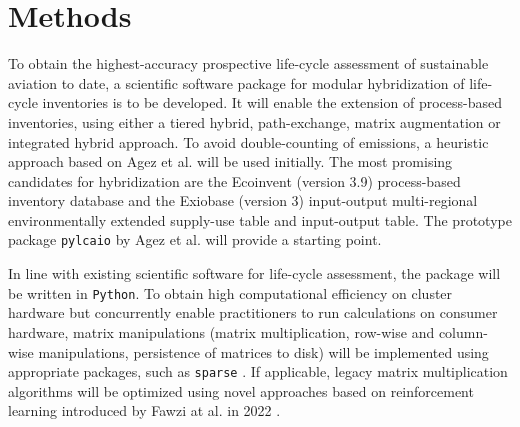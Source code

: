 \documentclass{article}
\begin{document}
    
    
    
\section{Methods}

    To obtain the highest-accuracy prospective life-cycle assessment of sustainable aviation to date, a scientific software package for modular hybridization of life-cycle inventories is to be developed. It will enable the extension of process-based inventories, using either a tiered hybrid, path-exchange, matrix augmentation or integrated hybrid \cite{hauschild_life_2015}\cite{hauschild_life_2018}\cite{crawford_hybrid_2018} approach. To avoid double-counting of emissions, a heuristic approach based on Agez et al. \cite{agez_lifting_2019}\cite{agez_correcting_2022}\cite{agez_hybridization_2020} will be used initially. The most promising candidates for hybridization are the Ecoinvent (version 3.9) process-based inventory database and the Exiobase (version 3) input-output multi-regional environmentally extended supply-use  table and input-output table. The prototype package \texttt{pylcaio} by Agez et al. \cite{noauthor_pylcaio_2022} will provide a starting point.
    
    In line with existing scientific software for life-cycle assessment, the package will be written in \texttt{Python}. To obtain high computational efficiency on cluster hardware but concurrently enable practitioners to run calculations on consumer hardware, matrix manipulations (matrix multiplication, row-wise and column-wise manipulations, persistence of matrices to disk) will be implemented using appropriate packages, such as \texttt{sparse} \cite{abbasi_sparse_2018}. If applicable, legacy matrix multiplication algorithms will be optimized using novel approaches based on reinforcement learning introduced by Fawzi at al. in 2022 \cite{fawzi_discovering_2022}.
    
\end{document}
